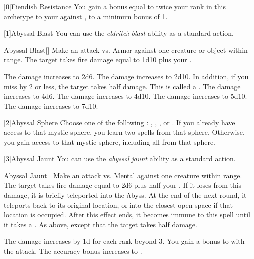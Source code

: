         [0]{Fiendish Resistance} You gain a bonus equal to twice your rank in this archetype to your  against , to a minimum bonus of 1.

        [1]{Abyssal Blast} You can use the \textit{eldritch blast} ability as a standard action.
        \begin{freeability}{Abyssal Blast}[]
            Make an attack vs. Armor against one creature or object within \rngmed range.
            \hit The target takes fire damage equal to 1d10 plus your .

            \rankline
             The damage increases to 2d6.
             The damage increases to 2d10.
                In addition, if you miss by 2 or less, the target takes half damage.
                This is called a .
             The damage increases to 4d6.
             The damage increases to 4d10.
             The damage increases to 5d10.
             The damage increases to 7d10.
        \end{freeability}

        [2]{Abyssal Sphere} Choose one of the following : , , , or .
        If you already have access to that mystic sphere, you learn two spells from that sphere.
        Otherwise, you gain access to that mystic sphere, including all  from that sphere.

        [3]{Abyssal Jaunt} You can use the \textit{abyssal jaunt} ability as a standard action.
        \begin{freeability}{Abyssal Jaunt}[]
            Make an attack vs. Mental against one creature within \rngmed range.
            \hit The target takes fire damage equal to 2d6 plus half your .
            If it loses  from this damage, it is briefly teleported into the Abyss.
            At the end of the next round, it teleports back to its original location, or into the closest open space if that location is occupied.
            After this effect ends, it becomes immune to this spell until it takes a .
            \glance As above, except that the target takes half damage.

            \rankline
            The damage increases by \plus1d for each rank beyond 3.
             You gain a  bonus to  with the attack.
             The accuracy bonus increases to .
        \end{freeability}

